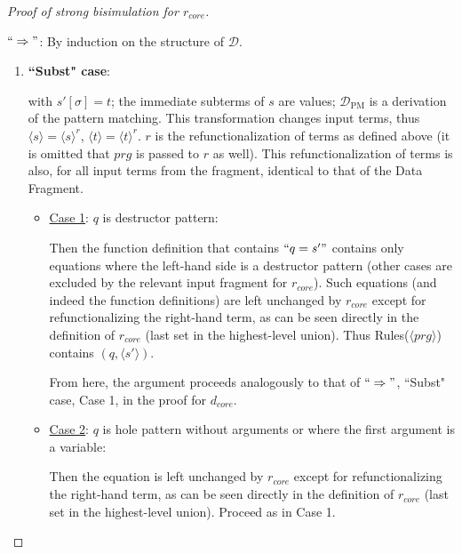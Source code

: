 \begin{proof}[Proof of strong bisimulation for $r_{core}$] ~

$`` \Rightarrow "$: By induction on the structure of $\mathcal{D}$.

\begin{enumerate}
\item \textbf{``Subst" case}:

\begin{prooftree}
\end{prooftree}

with $s'[\sigma] = t$; the immediate subterms of $s$ are values; $\mathcal{D}_{\textrm{PM}}$ is a derivation of the pattern matching. This transformation changes input terms, thus $\langle s \rangle = \langle s \rangle^r$, $\langle t \rangle = \langle t \rangle^r$. $r$ is the refunctionalization of terms as defined above (it is omitted that $prg$ is passed to $r$ as well). This refunctionalization of terms is also, for all input terms from the fragment, identical to that of the Data Fragment.

\begin{itemize}

\item \underline{Case 1}: $q$ is destructor pattern:

Then the function definition that contains $`` q = s' "$ contains only equations where the left-hand side is a destructor pattern (other cases are excluded by the relevant input fragment for $r_{core}$). Such equations (and indeed the function definitions) are left unchanged by $r_{core}$ except for refunctionalizing the right-hand term, as can be seen directly in the definition of $r_{core}$ (last set in the highest-level union). Thus Rules($\langle prg \rangle$) contains $(q, \langle s' \rangle)$.

From here, the argument proceeds analogously to that of $`` \Rightarrow "$, ``Subst" case, Case 1, in the proof for $d_{core}$.

\item \underline{Case 2}: $q$ is hole pattern without arguments or where the first argument is a variable:

Then the equation is left unchanged by $r_{core}$ except for refunctionalizing the right-hand term, as can be seen directly in the definition of $r_{core}$ (last set in the highest-level union). Proceed as in Case 1.


\end{itemize}
\end{enumerate}
\end{proof}
